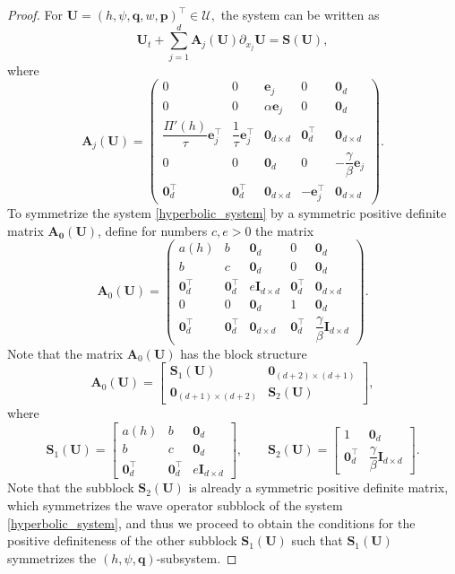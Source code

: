 \documentclass[11pt]{article}
\numberwithin{equation}{section}
\newtheorem{counter example}[theorem]{Counter Example}
\numberwithin{equation}{section}
\numberwithin{equation}{section}
\begin{document}
\begin{proof}
For $\mathbf U
=
\left(h,\psi,\mathbf q,w,\mathbf p\right)^\top\in \mathcal{U},$ the system can be written as
\[
\mathbf U_t
+\sum_{j=1}^d
\mathbf A_j(\mathbf U)\partial_{x_j}\mathbf U
=
\mathbf S(\mathbf U),
\]
where
\[
\mathbf A_j(\mathbf U)
=
\begin{pmatrix}
0&0&\mathbf e_j&0&\mathbf 0_d\\
0&0&\alpha\mathbf e_j&0&\mathbf 0_d\\
\dfrac{\Pi'(h)}{\tau}\mathbf e_j^\top&
\dfrac1\tau\mathbf e_j^\top&
\mathbf 0_{d\times d}&
\mathbf 0_d^\top&
\mathbf 0_{d\times d}\\
0&0&\mathbf 0_d&0&
-\dfrac{\gamma}{\beta}\mathbf e_j\\
\mathbf 0_d^\top&\mathbf 0_d^\top&
\mathbf 0_{d\times d}&
-\mathbf e_j^\top&
\mathbf 0_{d\times d}
\end{pmatrix}.
\]
To symmetrize the system \eqref{hyperbolic_system} by a symmetric positive definite matrix $\mathbf{A_0(U)}$, define for numbers $c, e>0$ the matrix
\[
\mathbf A_0(\mathbf U)
=
\begin{pmatrix}
a(h)&b&\mathbf 0_d&0&\mathbf 0_d\\
b&c&\mathbf 0_d&0&\mathbf 0_d\\
\mathbf 0_d^\top&\mathbf 0_d^\top&
e\mathbf I_{d\times d}&
\mathbf 0_d^\top&\mathbf 0_{d\times d}\\
0&0&\mathbf 0_d&1&\mathbf 0_d\\
\mathbf 0_d^\top&\mathbf 0_d^\top&
\mathbf 0_{d\times d}&
\mathbf 0_d^\top&
\dfrac{\gamma}{\beta}\mathbf I_{d\times d}
\end{pmatrix}.
\]
Note that the matrix $\mathbf A_0(\mathbf U)$ has the block structure
\[
\mathbf A_0(\mathbf U)
=
\begin{bmatrix}
\mathbf S_1(\mathbf U)
&
\mathbf 0_{(d+2)\times(d+1)}
\\
\mathbf 0_{(d+1)\times(d+2)}
&
\mathbf S_2(\mathbf U)
\end{bmatrix},
\]
where
\[
\mathbf S_1(\mathbf U)
=
\begin{bmatrix}
a(h)&b&\mathbf 0_d\\
b&c&\mathbf 0_d\\
\mathbf 0_d^\top&\mathbf 0_d^\top&
e\mathbf I_{d\times d}
\end{bmatrix},
\qquad
\mathbf S_2(\mathbf U)
=
\begin{bmatrix}
1&\mathbf 0_d\\
\mathbf 0_d^\top&
\dfrac{\gamma}{\beta}\mathbf I_{d\times d}
\end{bmatrix}.
\]
Note that the subblock $\mathbf{S}_2(\mathbf{U})$ is already a symmetric positive definite matrix, which symmetrizes the wave operator subblock of the system \eqref{hyperbolic_system}, and thus we proceed to obtain the conditions for the positive definiteness of the other subblock $\mathbf{S}_1(\mathbf{U})$ such that $\mathbf{S}_1(\mathbf{U})$ symmetrizes the $(h,\psi,\mathbf q)$-subsystem.


\end{proof}
\end{document}
